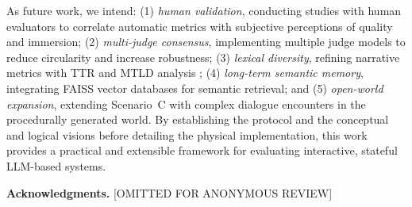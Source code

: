 \documentclass[12pt]{article}
\begin{document}
As future work, we intend: (1) \textit{human validation}, conducting studies with human evaluators to correlate automatic metrics with subjective perceptions of quality and immersion; (2) \textit{multi-judge consensus}, implementing multiple judge models to reduce circularity and increase robustness; (3) \textit{lexical diversity}, refining narrative metrics with TTR and MTLD analysis \cite{reviriego:2024}; (4) \textit{long-term semantic memory}, integrating FAISS vector databases for semantic retrieval; and (5) \textit{open-world expansion}, extending Scenario~C with complex dialogue encounters in the procedurally generated world. By establishing the protocol and the conceptual and logical visions before detailing the physical implementation, this work provides a practical and extensible framework for evaluating interactive, stateful LLM-based systems.

\textbf{Acknowledgments.} [OMITTED FOR ANONYMOUS REVIEW]



\end{document}
